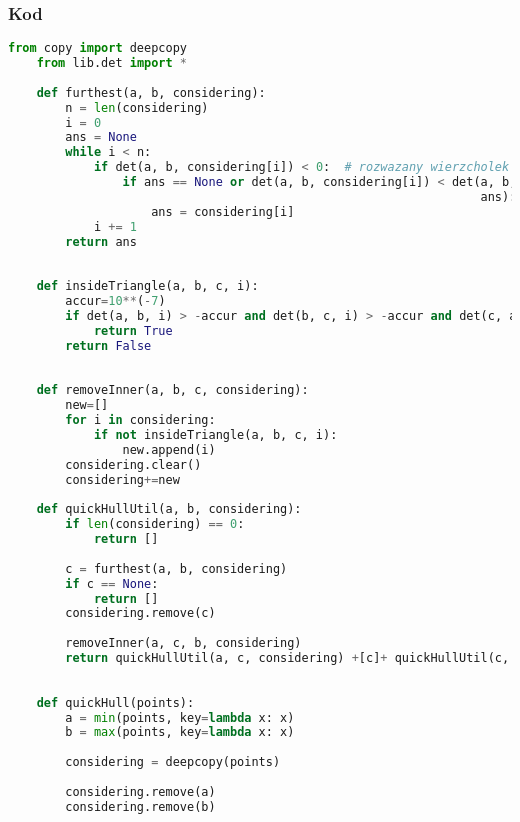 \documentclass[11pt]{article}
\theoremstyle{remark} \newtheorem{definition}{def.}
\theoremstyle{definition} \newtheorem{twierdzenie}{tw.}
\begin{document}
    \subsubsection{Kod}
\begin{lstlisting}[language=Python]
    from copy import deepcopy
    from lib.det import *
    
    def furthest(a, b, considering):
        n = len(considering)
        i = 0
        ans = None
        while i < n:
            if det(a, b, considering[i]) < 0:  # rozwazany wierzcholek jest po prawej stronie ab
                if ans == None or det(a, b, considering[i]) < det(a, b,
                                                                  ans):  # |det(a,b,c)| = 1/2|ab|*h, gdzie h jest wysokoscia z c na ab
                    ans = considering[i]
            i += 1
        return ans
    
    
    def insideTriangle(a, b, c, i):
        accur=10**(-7)
        if det(a, b, i) > -accur and det(b, c, i) > -accur and det(c, a, i) > -accur:
            return True
        return False
    
    
    def removeInner(a, b, c, considering):
        new=[]
        for i in considering:
            if not insideTriangle(a, b, c, i):
                new.append(i)
        considering.clear()
        considering+=new
    
    def quickHullUtil(a, b, considering):
        if len(considering) == 0:
            return []
    
        c = furthest(a, b, considering)
        if c == None:
            return []
        considering.remove(c)
    
        removeInner(a, c, b, considering)
        return quickHullUtil(a, c, considering) +[c]+ quickHullUtil(c, b, considering)
    
    
    def quickHull(points):
        a = min(points, key=lambda x: x)
        b = max(points, key=lambda x: x)
    
        considering = deepcopy(points)
    
        considering.remove(a)
        considering.remove(b)
    
\end{lstlisting}

    \medskip

\end{document}
